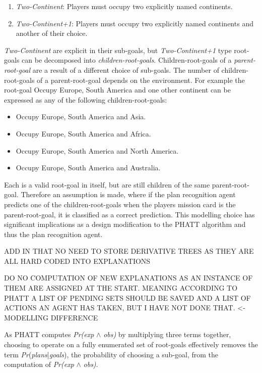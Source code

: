 \documentclass[parskip]{cs4rep}
\begin{document}
\begin{enumerate}
\item
\textit{Two-Continent}: Players must occupy two explicitly named continents.
\item
\textit{Two-Continent+1}: Players must occupy two explicitly named continents and another of their choice.
\end{enumerate}

\textit{Two-Continent} are explicit in their sub-goals, but \textit{Two-Continent+1} type root-goals can be decomposed into \textit{children-root-goals}. Children-root-goals of a \textit{parent-root-goal} are a result of a different choice of sub-goals. The number of children-root-goals of a parent-root-goal depends on the environment. For example the root-goal Occupy Europe, South America and one other continent can be expressed as any of the following children-root-goals:

\begin{itemize}
\item
Occupy Europe, South America and Asia.
\item
Occupy Europe, South America and Africa.
\item
Occupy Europe, South America and North America.
\item
Occupy Europe, South America and Australia.\newline
\end{itemize}

Each is a valid root-goal in itself, but are still children of the same parent-root-goal. Therefore an assumption is made, where if the plan recognition agent predicts one of the children-root-goals when the players mission card is the parent-root-goal, it is classified as a correct prediction. This modelling choice has significant implications as a design modification to the PHATT algorithm and thus the plan recognition agent.

ADD IN THAT NO NEED TO STORE DERIVATIVE TREES AS THEY ARE ALL HARD CODED INTO EXPLANATIONS

DO NO COMPUTATION OF NEW EXPLANATIONS AS AN INSTANCE OF THEM ARE ASSIGNED AT THE START. MEANING ACCORDING TO PHATT A LIST OF PENDING SETS SHOULD BE SAVED AND A LIST OF ACTIONS AN AGENT HAS TAKEN, BUT I HAVE NOT DONE THAT. <- MODELLING DIFFERENCE

As PHATT computes \textit{Pr(exp} $\wedge$ \textit{obs)} by multiplying three terms together, choosing to operate on a fully enumerated set of root-goals effectively removes the term \textit{Pr}(\textit{plans}|\textit{goals}), the probability of choosing a sub-goal, from the computation of \textit{Pr(exp} $\wedge$ \textit{obs)}.
\end{document}
